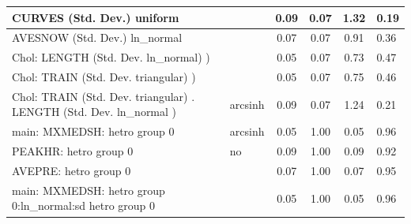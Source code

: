 \begin{table}
\begin{center}
\begin{tabular}{|l|l|c|c|c|l|}
			\hline
			CURVES (Std. Dev.) uniform &  & 0.09 & 0.07 & 1.32 & 0.19 \\
			\hline
			AVESNOW (Std. Dev.) ln_normal &  & 0.07 & 0.07 & 0.91 & 0.36 \\
			\hline
			 Chol: LENGTH (Std. Dev. ln_normal) ) &  & 0.05 & 0.07 & 0.73 & 0.47 \\
			\hline
			 Chol: TRAIN (Std. Dev. triangular) ) &  & 0.05 & 0.07 & 0.75 & 0.46 \\
			\hline
			 Chol: TRAIN (Std. Dev. triangular) . LENGTH (Std. Dev.   ln_normal ) & arcsinh & 0.09 & 0.07 & 1.24 & 0.21 \\
			\hline
			main: MXMEDSH: hetro group 0 & arcsinh & 0.05 & 1.00 & 0.05 & 0.96 \\
			\hline
			PEAKHR: hetro group 0 & no & 0.09 & 1.00 & 0.09 & 0.92 \\
			\hline
			AVEPRE: hetro group 0 &  & 0.07 & 1.00 & 0.07 & 0.95 \\
			\hline
			main: MXMEDSH: hetro group 0:ln_normal:sd  hetro group 0 &  & 0.05 & 1.00 & 0.05 & 0.96 \\
			\hline
		\end{tabular}
	\end{center}
\end{table}